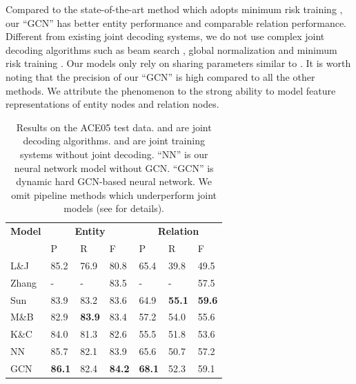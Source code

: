 Compared to the state-of-the-art method which adopts minimum risk training \cite{D18-1249},
our ``GCN''   has better entity performance and comparable relation performance.
Different from existing joint decoding systems, 
we do not use complex joint decoding algorithms such as beam search \cite{li-ji:2014:P14-1}, 
global normalization \cite{zhang-zhang-fu:2017:EMNLP2017} and minimum risk training \cite{D18-1249}.
Our models only rely on sharing parameters similar to \cite{miwa-bansal:2016:P16-1,katiyar-cardie:2017:Long}.
It is worth noting that the precision of our ``GCN''  is
high compared to all the other methods. 
We attribute the phenomenon to the strong ability to model feature representations of entity nodes and relation nodes.
\begin{table}
\centering
\footnotesize
\begin{tabular}{l|lll|lll}
    \toprule
    \textbf{Model}&\multicolumn{3}{c}{\textbf{Entity}}&\multicolumn{3}{c}{\textbf{Relation}} \\
    & P & R & F & P & R & F\\
    \midrule
    L\&J \citeyearpar{li-ji:2014:P14-1} & 
    85.2 & 76.9 & 80.8 & 65.4 & 39.8 & 49.5\\
   
    Zhang \citeyearpar{zhang-zhang-fu:2017:EMNLP2017} 
    & - & - & 83.5 & - & - & 57.5 \\
    Sun \citeyearpar{D18-1249} & 83.9 & 83.2 & 83.6 & 64.9 & \textbf{55.1} & \textbf{59.6} \\
    \midrule
    M\&B \citeyearpar{miwa-bansal:2016:P16-1} & 
    82.9 & \textbf{83.9} & 83.4 & 57.2 & 54.0 & 55.6 \\
    K\&C \citeyearpar{katiyar-cardie:2017:Long} & 
    84.0 & 81.3 & 82.6 & 55.5 & 51.8 & 53.6 \\
    NN & 
    85.7 & 82.1 & 83.9 & 65.6 & 50.7 & 57.2 \\
    GCN  & \textbf{86.1} & 82.4 & \textbf{84.2} & \textbf{68.1} & 52.3 & 59.1 \\
    \bottomrule
\end{tabular}
\caption{\small Results on the ACE05 test data.
\citet{li-ji:2014:P14-1} 
\citet{zhang-zhang-fu:2017:EMNLP2017} and
\citet{D18-1249} are joint decoding algorithms.
\citet{miwa-bansal:2016:P16-1} and \citet{katiyar-cardie:2017:Long}
are joint training systems without joint decoding.
``NN'' is our neural network model without GCN.
``GCN'' is dynamic hard GCN-based neural network.
We omit pipeline methods which underperform joint models
(see \cite{li-ji:2014:P14-1} for details).
}
\label{tab:res-baseline-ace}
\end{table}

